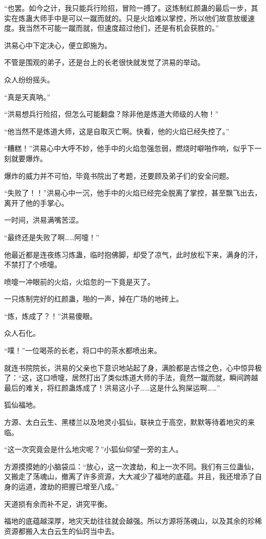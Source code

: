 \begin{this_body}
“也罢。如今之计，我只能兵行险招，冒险一搏了。这炼制红颜蛊的最后一步，其实在炼蛊大师手中是可以一蹴而就的。只是火焰难以掌控，所以他们故意放缓速度。我当然不可能一蹴而就，但速度超过他们，还是有机会获胜的。”

洪易心中下定决心，便立即施为。

不管是围观的弟子，还是台上的长老很快就发觉了洪易的举动。

众人纷纷摇头。

“真是天真呐。”

“洪易想兵行险招，但怎么可能翻盘？除非他是炼道大师级的人物！”

“他当然不是炼道大师，这是自取灭亡啊。快看，他的火焰已经失控了。”

“糟糕！”洪易心中大呼不妙，他手中的火焰忽强忽弱，燃烧时噼啪作响，似乎下一刻就要爆炸。

爆炸的威力并不可怕，毕竟书院出了考题，还要顾及弟子们的安全问题。

“失败了！！”洪易心中一沉，他手中的火焰已经完全脱离了掌控，甚至飘飞出去，离开了他的手掌心。

一时间，洪易满嘴苦涩。

“最终还是失败了啊……阿嚏！”

他最近都是连夜练习炼蛊，临时抱佛脚，却受了凉气，此时放松下来，满身的汗，不禁打了个喷嚏。

喷嚏一冲眼前的火焰，火焰忽的一下竟是灭了。

一只炼制完好的红颜蛊，啪的一声，掉在广场的地砖上。

“炼，炼成了？！”洪易傻眼。

众人石化。

“噗！”一位喝茶的长老，将口中的茶水都喷出来。

就连书院院长，洪易的父亲也下意识地站起了身，满脸都是古怪之色，心中惊异极了：“这，这口喷嚏，居然打出了类似炼道大师的手法，竟然一蹴而就，瞬间跨越最后的难关，将红颜蛊炼成了！洪易这小子……这是什么狗屎运啊……”

狐仙福地。

方源、太白云生、黑楼兰以及地灵小狐仙，联袂立于高空，默默等待着地灾的来临。

“这一次究竟会是什么地灾呢？”小狐仙仰望一旁的主人。

方源摸摸她的小脑袋瓜：“放心，这一次渡劫，和上一次不同。我们有三位蛊仙，又搬走了荡魂山，撤离了许多资源，大大减少了福地的底蕴。并且，我还增添了自身的运道，渡劫的把握已增至八成。”

天道损有余而补不足，讲究平衡。

福地的底蕴越深厚，地灾天劫往往就会越强。所以方源将荡魂山，以及其余的珍稀资源都搬入太白云生的仙窍当中去。


\end{this_body}
